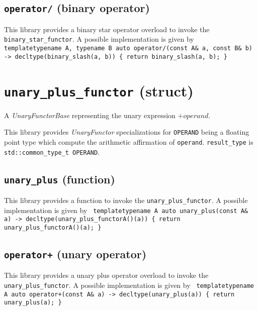 \documentclass[oneside]{book}
\begin{document}
\subsection{\texttt{operator/} (binary operator)}
This library provides a binary star operator overload to invoke the \texttt{binary\_star\_functor}.
A possible implementation is given by\newline
\texttt{
template\textlangle typename A, typename B\textrangle\newline
auto operator/(const A\& a, const B\& b) -> decltype(binary\_slash(a, b))\newline
\{ return binary\_slash(a, b); \}
}

\section{\texttt{unary\_plus\_functor} (struct)}
A \textit{UnaryFunctorBase} representing the unary expression $+\textit{operand}$.\newline

\noindent{}This library provides \textit{UnaryFunctor}            specializations for
\texttt{OPERAND} being a floating point type which compute the arithmetic affirmation
of \texttt{operand}. \texttt{result\_type} is \texttt{std::common\_type\_t\textlangle
OPERAND\textrangle}.

\subsection{\texttt{unary\_plus} (function)}
This library provides a function to invoke the \texttt{unary\_plus\_functor}.
A possible implementation is given by\newline
\texttt{
template\textlangle typename A\textrangle\newline
auto unary\_plus(const A\& a) -> decltype(unary\_plus\_functor\textlangle A\textrangle()(a))\newline
\{ return unary\_plus\_functor\textlangle A\textrangle()(a); \}
}

\subsection{\texttt{operator+} (unary operator)}
This library provides a unary plus operator overload to invoke the \texttt{unary\_plus\_functor}.
A possible implementation is given by\newline
\texttt{
template\textlangle typename A\textrangle\newline
auto operator+(const A\& a) -> decltype(unary\_plus(a))\newline
\{ return unary\_plus(a); \}
}
\end{document}
